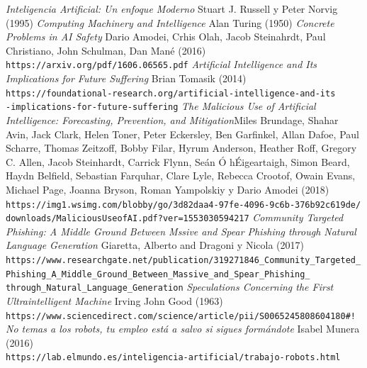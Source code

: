 \documentclass[12pt,a4paper]{article}
\begin{document}
\begin{thebibliography}{9}

 \textit{Inteligencia Artificial: Un enfoque Moderno} Stuart J. Russell y Peter Norvig (1995)
\textit{Computing Machinery and Intelligence} Alan Turing (1950)
 \textit{Concrete Problems in AI Safety} Dario Amodei, Crhis Olah, Jacob Steinahrdt, Paul Christiano, John Schulman, Dan Mané (2016)
\\\texttt{https://arxiv.org/pdf/1606.06565.pdf}
 \textit{Artificial Intelligence and Its Implications for Future Suffering} Brian Tomasik (2014)
\\\texttt{https://foundational-research.org/artificial-intelligence-and-its}
\\\texttt{-implications-for-future-suffering}
 \textit{The Malicious Use of Artificial Intelligence: Forecasting, Prevention, and Mitigation}Miles Brundage, Shahar Avin,  Jack Clark, Helen Toner, Peter Eckersley, Ben Garfinkel, Allan Dafoe, Paul Scharre, Thomas Zeitzoff, Bobby Filar, Hyrum Anderson, Heather Roff, Gregory C. Allen, Jacob Steinhardt, Carrick Flynn, Seán Ó hÉigeartaigh, Simon Beard, Haydn Belfield, Sebastian Farquhar, Clare Lyle, Rebecca Crootof, Owain Evans, Michael Page, Joanna Bryson, Roman Yampolskiy y Dario Amodei (2018)
\\\texttt{https://img1.wsimg.com/blobby/go/3d82daa4-97fe-4096-9c6b-376b92c619de/}
\\\texttt{downloads/MaliciousUseofAI.pdf?ver=1553030594217}
 \textit{Community Targeted Phishing: A Middle Ground Between Mssive and Spear Phishing through Natural Language Generation} Giaretta, Alberto and Dragoni y Nicola (2017)
\\\texttt{https://www.researchgate.net/publication/319271846\_Community\_Targeted\_}
\\\texttt{Phishing\_A\_Middle\_Ground\_Between\_Massive\_and\_Spear\_Phishing\_}
\texttt{through\_Natural\_Language\_Generation}
 \textit{Speculations Concerning the First Ultraintelligent Machine} Irving John Good (1963)
\\\texttt{https://www.sciencedirect.com/science/article/pii/S0065245808604180\#!}
 \textit{No temas a los robots, tu empleo está a salvo si sigues formándote} Isabel Munera (2016)
\\\texttt{https://lab.elmundo.es/inteligencia-artificial/trabajo-robots.html}

\end{thebibliography}
\end{document}

